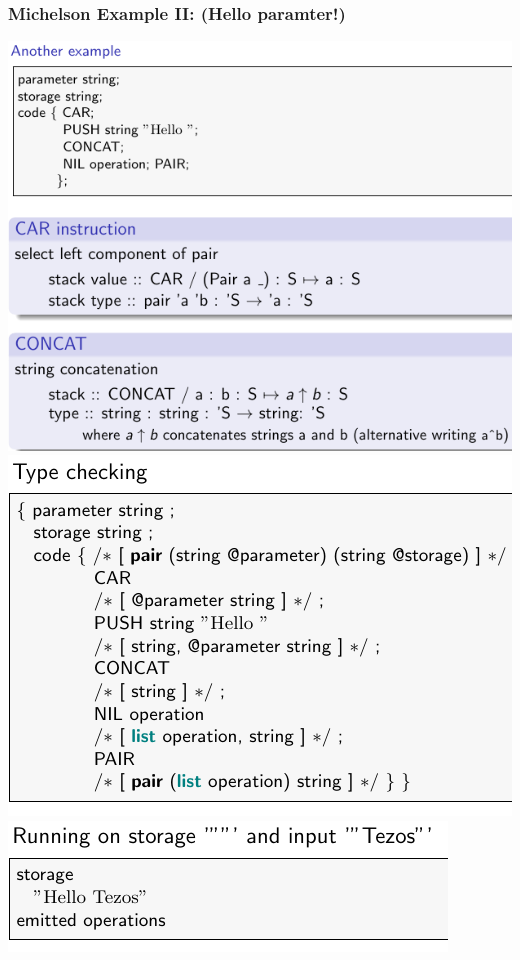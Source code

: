 \documentclass{article}
\begin{document}
\subsubsection{Michelson Example II: (Hello paramter!)}
\includegraphics[scale=0.4]{60.png}
\includegraphics[scale=0.4]{61.png}\\
\includegraphics[scale=0.4]{62.png}
\end{document}
